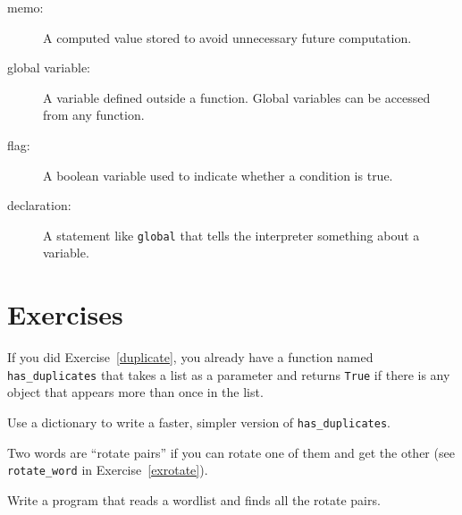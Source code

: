 \documentclass[10pt]{book}
\begin{document}
\begin{description}
\item[memo:] A computed value stored to avoid unnecessary future 
computation.

\item[global variable:]  A variable defined outside a function.  Global
variables can be accessed from any function.

\item[flag:] A boolean variable used to indicate whether a condition
is true.

\item[declaration:] A statement like {\tt global} that tells the
interpreter something about a variable.

\end{description}

\section{Exercises}

\begin{ex}

If you did Exercise~\ref{duplicate}, you already have
a function named \verb"has_duplicates" that takes a list
as a parameter and returns {\tt True} if there is any object
that appears more than once in the list.

Use a dictionary to write a faster, simpler version of
\verb"has_duplicates".
\end{ex}


\begin{ex}
\label{exrotatepairs}


Two words are ``rotate pairs'' if you can rotate one of them
and get the other (see \verb"rotate_word" in Exercise~\ref{exrotate}).

Write a program that reads a wordlist and finds all the rotate
pairs.
\end{ex}
\end{document}
